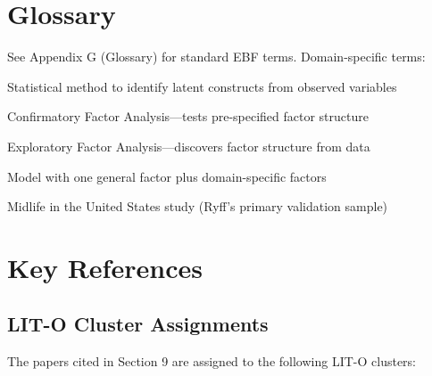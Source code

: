 \section*{Glossary}
\label{sec:bj-glossary}

See Appendix G (Glossary) for standard EBF terms. Domain-specific terms:

\begin{description}[nosep]
\item[Factor Analysis] Statistical method to identify latent constructs from observed variables
\item[CFA] Confirmatory Factor Analysis---tests pre-specified factor structure
\item[EFA] Exploratory Factor Analysis---discovers factor structure from data
\item[Bifactor Model] Model with one general factor plus domain-specific factors
\item[MIDUS] Midlife in the United States study (Ryff's primary validation sample)
\end{description}


\section*{Key References}
\label{sec:bj-references}

\subsection*{LIT-O Cluster Assignments}

The papers cited in Section 9 are assigned to the following LIT-O clusters:

